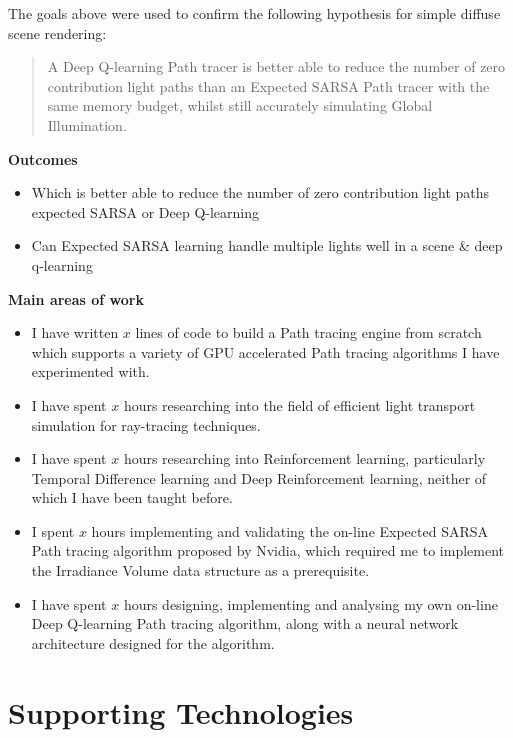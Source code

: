 \documentclass[ %
                    author={Callum Pearce},
                supervisor={Dr. Neill Campbell},
                    degree={MEng},
                     title={How effective are Temporal difference learning methods for reducing the number of zero contribution light paths while still accurately approximating Global Illumination in Path tracing?},
                  subtitle={},
                      type={research},
                      year={2019} ]{dissertation}
\begin{document}
\noindent
The goals above were used to confirm the following hypothesis for simple
diffuse scene rendering:

\begin{quote}
A Deep Q-learning Path tracer is better able to reduce
the number of zero contribution light paths than an Expected SARSA
Path tracer with the same memory budget, whilst still accurately
simulating Global Illumination.
\end{quote}


\noindent
\textbf{Outcomes}
\begin{itemize}
\item Which is better able to reduce the number of zero contribution light paths expected SARSA or Deep Q-learning
\item Can Expected SARSA learning handle multiple lights well in a scene \& deep q-learning
\end{itemize}

\noindent
\textbf{Main areas of work}
\begin{itemize}
\item I have written $x$ lines of code to build a  Path tracing engine from scratch which supports a variety of GPU accelerated Path tracing algorithms I have experimented with.

\item I have spent $x$ hours researching into the field of efficient light transport simulation for ray-tracing techniques.

\item I have spent $x$ hours researching into Reinforcement learning, particularly Temporal Difference learning and Deep Reinforcement learning, neither of which I have been taught before.

\item I spent $x$ hours implementing and validating the on-line Expected SARSA Path tracing algorithm proposed by Nvidia, which required me to implement the Irradiance Volume data structure as a prerequisite.

\item I have spent $x$ hours designing, implementing and analysing my own on-line Deep Q-learning Path tracing algorithm, along with a neural network architecture
designed for the algorithm.

\end{itemize}



\chapter*{Supporting Technologies}
\end{document}
